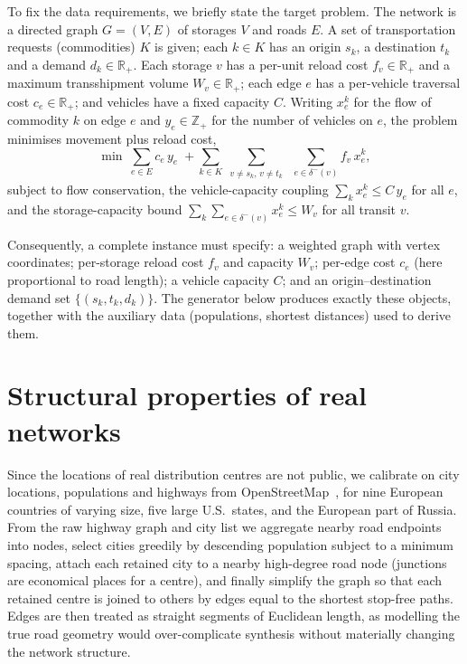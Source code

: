 \documentclass[11pt]{article}
\newcommand{\Vv}{V}
\newcommand{\E}{E}
\newcommand{\Real}{\mathbb{R}}
\begin{document}
To fix the data requirements, we briefly state the target problem. The network
is a directed graph $G=(\Vv,\E)$ of storages $\Vv$ and roads $\E$. A set of
transportation requests (commodities) $K$ is given; each $k\in K$ has an origin
$s_k$, a destination $t_k$ and a demand $d_k\in\Real_+$. Each storage $v$ has a
per-unit reload cost $f_v\in\Real_+$ and a maximum transshipment volume
$W_v\in\Real_+$; each edge $e$ has a per-vehicle traversal cost $c_e\in\Real_+$;
and vehicles have a fixed capacity $C$. Writing $x^k_e$ for the flow of
commodity $k$ on edge $e$ and $y_e\in\mathbb{Z}_+$ for the number of vehicles on
$e$, the problem minimises movement plus reload cost,
\begin{equation}
\min\ \sum_{e\in \E} c_e\,y_e
 \;+\!\!\sum_{k\in K}\sum_{\substack{v\neq s_k,\,v\neq t_k}}\;
 \sum_{e\in\delta^-(v)} f_v\,x^k_e,
\end{equation}
subject to flow conservation, the vehicle-capacity coupling
$\sum_{k} x^k_e\le C\,y_e$ for all $e$, and the storage-capacity bound
$\sum_{k}\sum_{e\in\delta^-(v)} x^k_e\le W_v$ for all transit $v$.

Consequently, a complete instance must specify: a weighted graph with vertex
coordinates; per-storage reload cost $f_v$ and capacity $W_v$; per-edge cost
$c_e$ (here proportional to road length); a vehicle capacity $C$; and an
origin--destination demand set $\{(s_k,t_k,d_k)\}$. The generator below produces
exactly these objects, together with the auxiliary data (populations, shortest
distances) used to derive them.

\section{Structural properties of real networks}
\label{sec:real}

Since the locations of real distribution centres are not public, we calibrate on
city locations, populations and highways from OpenStreetMap~\cite{osm}, for nine
European countries of varying size, five large U.S.\ states, and the European
part of Russia. From the raw highway graph and city list we aggregate nearby
road endpoints into nodes, select cities greedily by descending population
subject to a minimum spacing, attach each retained city to a nearby high-degree
road node (junctions are economical places for a centre), and finally simplify
the graph so that each retained centre is joined to others by edges equal to the
shortest stop-free paths. Edges are then treated as straight segments of
Euclidean length, as modelling the true road geometry would over-complicate
synthesis without materially changing the network structure.
\end{document}
